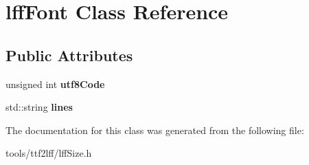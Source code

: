 \hypertarget{classlffFont}{\section{lff\-Font Class Reference}
\label{classlffFont}
}
\subsection*{Public Attributes}
\begin{DoxyCompactItemize}
\item 
\hypertarget{classlffFont_a574b9ac7c35a3c7e8e00fa92a71d083d}{unsigned int {\bfseries utf8\-Code}}\label{classlffFont_a574b9ac7c35a3c7e8e00fa92a71d083d}

\item 
\hypertarget{classlffFont_ac82b40c16cac9b5d1ef3ea7729340171}{std\-::string {\bfseries lines}}\label{classlffFont_ac82b40c16cac9b5d1ef3ea7729340171}

\end{DoxyCompactItemize}


The documentation for this class was generated from the following file\-:\begin{DoxyCompactItemize}
\item 
tools/ttf2lff/lff\-Size.\-h\end{DoxyCompactItemize}
